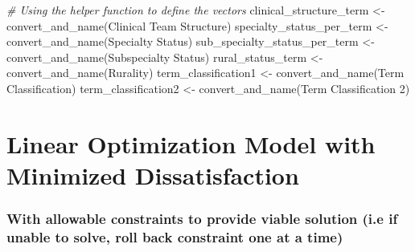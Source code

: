 \documentclass[
]{article}
\newenvironment{Shaded}{\begin{snugshade}}{\end{snugshade}}
\newcommand{\CommentTok}[1]{\textcolor[rgb]{0.56,0.35,0.01}{\textit{#1}}}
\newcommand{\FunctionTok}[1]{\textcolor[rgb]{0.00,0.00,0.00}{#1}}
\newcommand{\NormalTok}[1]{#1}
\newcommand{\OtherTok}[1]{\textcolor[rgb]{0.56,0.35,0.01}{#1}}
\newcommand{\StringTok}[1]{\textcolor[rgb]{0.31,0.60,0.02}{#1}}
\begin{document}
\begin{Shaded}
\begin{Highlighting}[]
\CommentTok{\# Using the helper function to define the vectors}
\NormalTok{clinical\_structure\_term }\OtherTok{\textless{}{-}} \FunctionTok{convert\_and\_name}\NormalTok{(}\StringTok{\textquotesingle{}Clinical Team Structure\textquotesingle{}}\NormalTok{)}
\NormalTok{specialty\_status\_per\_term }\OtherTok{\textless{}{-}} \FunctionTok{convert\_and\_name}\NormalTok{(}\StringTok{\textquotesingle{}Specialty Status\textquotesingle{}}\NormalTok{)}
\NormalTok{sub\_specialty\_status\_per\_term }\OtherTok{\textless{}{-}} \FunctionTok{convert\_and\_name}\NormalTok{(}\StringTok{\textquotesingle{}Subspecialty Status\textquotesingle{}}\NormalTok{)}
\NormalTok{rural\_status\_term }\OtherTok{\textless{}{-}} \FunctionTok{convert\_and\_name}\NormalTok{(}\StringTok{\textquotesingle{}Rurality\textquotesingle{}}\NormalTok{)}
\NormalTok{term\_classification1 }\OtherTok{\textless{}{-}} \FunctionTok{convert\_and\_name}\NormalTok{(}\StringTok{\textquotesingle{}Term Classification\textquotesingle{}}\NormalTok{)}
\NormalTok{term\_classification2 }\OtherTok{\textless{}{-}} \FunctionTok{convert\_and\_name}\NormalTok{(}\StringTok{\textquotesingle{}Term Classification 2\textquotesingle{}}\NormalTok{)}
\end{Highlighting}
\end{Shaded}

\hypertarget{linear-optimization-model-with-minimized-dissatisfaction}{%
\section{Linear Optimization Model with Minimized
Dissatisfaction}\label{linear-optimization-model-with-minimized-dissatisfaction}}

\hypertarget{with-allowable-constraints-to-provide-viable-solution-i.e-if-unable-to-solve-roll-back-constraint-one-at-a-time}{%
\subsubsection{With allowable constraints to provide viable solution
(i.e if unable to solve, roll back constraint one at a
time)}\label{with-allowable-constraints-to-provide-viable-solution-i.e-if-unable-to-solve-roll-back-constraint-one-at-a-time}}
\end{document}
